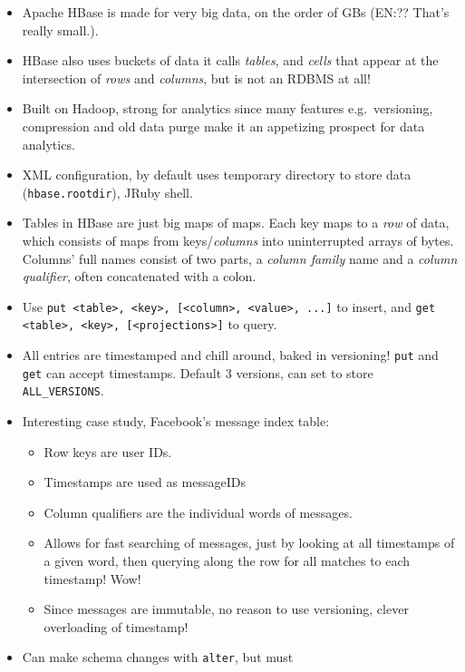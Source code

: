 \documentclass[10pt]{article}
\begin{document}
\begin{itemize}
    \item Apache HBase is made for very big data, on the order of GBs (EN:\@??
        That's really small.).
    \item HBase also uses buckets of data it calls \emph{tables}, and
        \emph{cells} that appear at the intersection of \emph{rows} and
        \emph{columns}, but is not an RDBMS at all!
    \item Built on Hadoop, strong for analytics since many features e.g.\
        versioning, compression and old data purge make it an appetizing
        prospect for data analytics.
    \item XML configuration, by default uses temporary directory to store data
        (\lstinline{hbase.rootdir}), JRuby shell.
    \item Tables in HBase are just big maps of maps. Each key maps to a
        \emph{row} of data, which consists of maps from keys/\emph{columns} into
        uninterrupted arrays of bytes. Columns' full names consist of two parts,
        a \emph{column family} name and a \emph{column qualifier}, often
        concatenated with a colon.
    \item Use \lstinline$put <table>, <key>, [<column>, <value>, ...]$ to
        insert, and \lstinline$get <table>, <key>, [<projections>]$ to query.
    \item All entries are timestamped and chill around, baked in versioning!
        \lstinline{put} and \lstinline{get} can accept timestamps. Default 3
        versions, can set to store \lstinline{ALL_VERSIONS}.
    \item Interesting case study, Facebook's message index table:
        \begin{itemize}
            \item Row keys are user IDs.
            \item Timestamps are used as messageIDs
            \item Column qualifiers are the individual words of messages.
            \item Allows for fast searching of messages, just by looking at all
                timestamps of a given word, then querying along the row for all
                matches to each timestamp! Wow!
            \item Since messages are immutable, no reason to use versioning,
                clever overloading of timestamp!
        \end{itemize}
    \item Can make schema changes with \lstinline{alter}, but must

\end{itemize}
\end{document}
